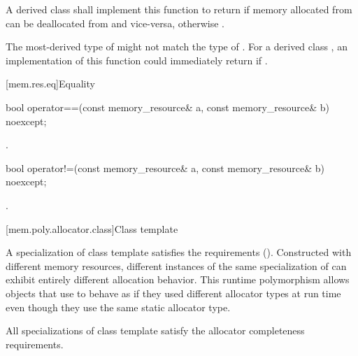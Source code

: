 \begin{itemdescr}
\pnum
\returns
A derived class shall implement this function to return  if memory allocated from  can be deallocated from  and vice-versa,
otherwise .
\begin{note}
The most-derived type of  might not match the type of .
For a derived class , an implementation of this function
could immediately return 
if .\end{note}
\end{itemdescr}

[mem.res.eq]{Equality}

%
\begin{itemdecl}
bool operator==(const memory_resource& a, const memory_resource& b) noexcept;
\end{itemdecl}

\begin{itemdescr}
\pnum
\returns
{}.
\end{itemdescr}

%
\begin{itemdecl}
bool operator!=(const memory_resource& a, const memory_resource& b) noexcept;
\end{itemdecl}

\begin{itemdescr}
\pnum
\returns
{}.
\end{itemdescr}

[mem.poly.allocator.class]{Class template }

\pnum
A specialization of class template 
satisfies the  requirements ().
Constructed with different memory resources,
different instances of the same specialization of 
can exhibit entirely different allocation behavior.
This runtime polymorphism allows objects that use 
to behave as if they used different allocator types at run time
even though they use the same static allocator type.

\pnum
All specializations of class template 
satisfy the allocator completeness requirements.

